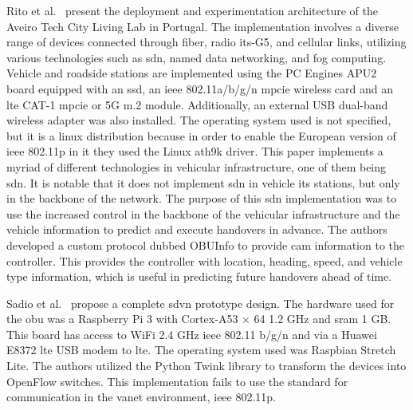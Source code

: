 Rito et al.~\cite{rito_aveiro_2023} present the deployment and experimentation architecture of the Aveiro Tech City Living Lab in Portugal. The implementation involves a diverse range of devices connected through fiber, radio \gls{its}-G5, and cellular links, utilizing various technologies such as \gls{sdn}, named data networking, and fog computing.
Vehicle and roadside stations are implemented using the PC Engines APU2 board equipped with an \gls{ssd}, an \gls{ieee} 802.11a/b/g/n \gls{mpcie} wireless card and an \gls{lte} CAT-1 \gls{mpcie} or 5G m.2 module. Additionally, an external USB dual-band wireless adapter was also installed. The operating system used is not specified, but it is a linux distribution because in order to enable the European version of \gls{ieee} 802.11p in it they used the Linux ath9k driver.
This paper implements a myriad of different technologies in vehicular infrastructure, one of them being \gls{sdn}. It is notable that it does not implement \gls{sdn} in vehicle \gls{its} stations, but only in the backbone of the network. The purpose of this \gls{sdn} implementation was to use the increased control in the backbone of the vehicular infrastructure and the vehicle information to predict and execute handovers in advance. The authors developed a custom protocol dubbed OBUInfo to provide \gls{cam} information to the controller. This provides the controller with location, heading, speed, and vehicle type information, which is useful in predicting future handovers ahead of time.


Sadio et al.~\cite{sadio_design_2020} propose a complete \gls{sdvn} prototype design. The hardware used for the \gls{obu} was a Raspberry Pi 3 with Cortex-A53 × 64 1.2 GHz and \gls{sram} 1 GB. This board has access to WiFi 2.4 GHz \gls{ieee} 802.11 b/g/n and via a Huawei E8372 \gls{lte} USB modem to \gls{lte}. The operating system used was Raspbian Stretch Lite. The authors utilized the Python Twink library to transform the devices into OpenFlow switches. This implementation fails to use the standard for communication in the \gls{vanet} environment, \gls{ieee} 802.11p.

